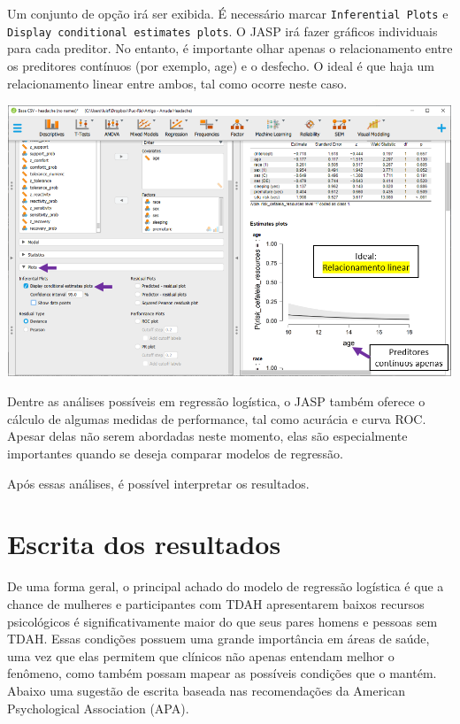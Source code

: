 \documentclass[
]{book}
\begin{document}
Um conjunto de opção irá ser exibida. É necessário marcar \texttt{Inferential\ Plots} e \texttt{Display\ conditional\ estimates\ plots}. O JASP irá fazer gráficos individuais para cada preditor. No entanto, é importante olhar apenas o relacionamento entre os preditores contínuos (por exemplo, age) e o desfecho. O ideal é que haja um relacionamento linear entre ambos, tal como ocorre neste caso.

\includegraphics{./img/cap_logistica_assumptions_plot2.png}

Dentre as análises possíveis em regressão logística, o JASP também oferece o cálculo de algumas medidas de performance, tal como acurácia e curva ROC. Apesar delas não serem abordadas neste momento, elas são especialmente importantes quando se deseja comparar modelos de regressão.

Após essas análises, é possível interpretar os resultados.

\hypertarget{escrita-dos-resultados-15}{%
\section{Escrita dos resultados}\label{escrita-dos-resultados-15}}

De uma forma geral, o principal achado do modelo de regressão logística é que a chance de mulheres e participantes com TDAH apresentarem baixos recursos psicológicos é significativamente maior do que seus pares homens e pessoas sem TDAH. Essas condições possuem uma grande importância em áreas de saúde, uma vez que elas permitem que clínicos não apenas entendam melhor o fenômeno, como também possam mapear as possíveis condições que o mantém. Abaixo uma sugestão de escrita baseada nas recomendações da American Psychological Association (APA).
\end{document}
